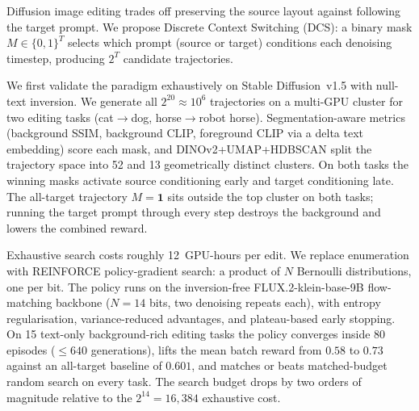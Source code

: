 Diffusion image editing trades off preserving the source layout against following the target prompt. We propose Discrete Context Switching (DCS): a binary mask $M \in \{0,1\}^T$ selects which prompt (source or target) conditions each denoising timestep, producing $2^T$ candidate trajectories.

We first validate the paradigm exhaustively on Stable Diffusion~v1.5 with null-text inversion. We generate all $2^{20}\approx 10^6$ trajectories on a multi-GPU cluster for two editing tasks (cat$\to$dog, horse$\to$robot horse). Segmentation-aware metrics (background SSIM, background CLIP, foreground CLIP via a delta text embedding) score each mask, and DINOv2+UMAP+HDBSCAN split the trajectory space into 52 and 13 geometrically distinct clusters. On both tasks the winning masks activate source conditioning early and target conditioning late. The all-target trajectory $M=\mathbf{1}$ sits outside the top cluster on both tasks; running the target prompt through every step destroys the background and lowers the combined reward.

Exhaustive search costs roughly 12~GPU-hours per edit. We replace enumeration with REINFORCE policy-gradient search: a product of $N$ Bernoulli distributions, one per bit. The policy runs on the inversion-free FLUX.2-klein-base-9B flow-matching backbone ($N=14$ bits, two denoising repeats each), with entropy regularisation, variance-reduced advantages, and plateau-based early stopping. On 15 text-only background-rich editing tasks the policy converges inside 80 episodes ($\le 640$ generations), lifts the mean batch reward from $0.58$ to $0.73$ against an all-target baseline of $0.601$, and matches or beats matched-budget random search on every task. The search budget drops by two orders of magnitude relative to the $2^{14}=16{,}384$ exhaustive cost.
